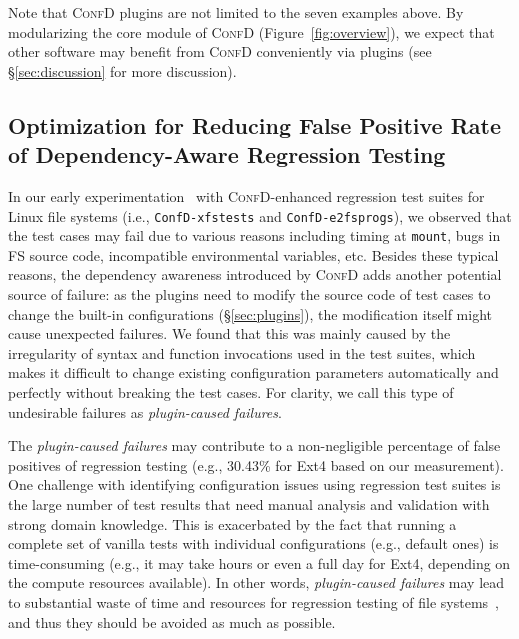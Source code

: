 \smallskip    
Note that \textsc{ConfD} plugins are not limited to the seven examples above. By modularizing the core module of  \textsc{ConfD} (Figure~\ref{fig:overview}), we expect that other software may benefit from  \textsc{ConfD} conveniently via plugins (see \S\ref{sec:discussion} for more discussion). \\

\subsection{Optimization for Reducing False Positive Rate of Dependency-Aware Regression Testing}
\label{sec:reducefalsepositives}

In our early experimentation~\cite{mahmud2023confd} with \textsc{ConfD}-enhanced  regression test suites for Linux file systems (i.e.,  \texttt{ConfD-xfstests} and \texttt{ConfD-e2fsprogs}), we observed that the test cases may fail  due to various reasons including timing at \texttt{mount}, bugs in FS source code, incompatible environmental variables, etc.
Besides these typical reasons, 
the dependency awareness introduced by \textsc{ConfD} 
adds another potential source of failure: 
as  the plugins need to modify the source code of test cases to change the  built-in configurations (\S\ref{sec:plugins}), the modification itself might cause unexpected failures. 
We found that this was mainly caused by the irregularity of syntax and function invocations used in the test suites, which makes it difficult to change existing configuration parameters automatically and perfectly without breaking the test cases. For clarity, we call this type of undesirable failures as \textit{plugin-caused failures}.

The \textit{plugin-caused failures} may contribute to a non-negligible percentage of  false positives of regression testing (e.g., 30.43\% for Ext4 based on our measurement). 
One  challenge with identifying configuration issues using  regression test suites is the large number of test results that need manual  analysis and validation with strong domain knowledge.
This is exacerbated by the fact that running a complete set of vanilla tests  with individual configurations (e.g., default ones) is time-consuming (e.g., it may take hours or even a full day for Ext4, depending on the compute resources available\cite{storagetesting}). In other words, \textit{plugin-caused failures}  may lead to substantial waste of time and resources for regression testing of file systems~\cite{howtofindExt4bugs}, and thus they should be avoided as much as possible.

